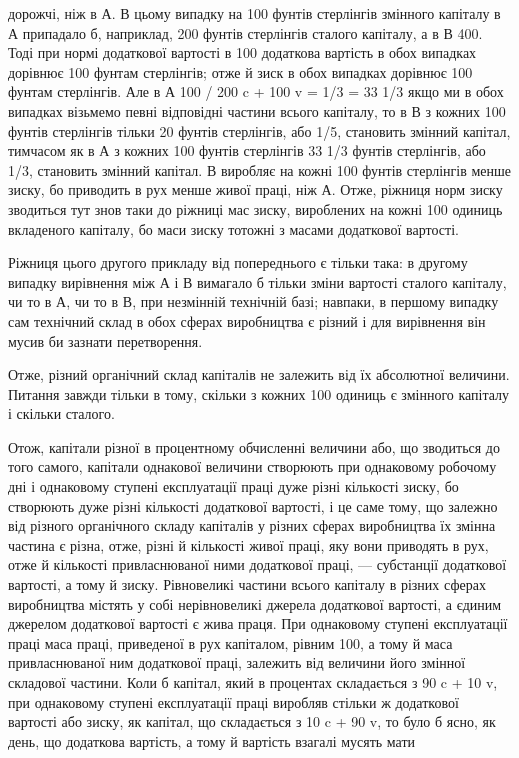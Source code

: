 дорожчі, ніж в А. В цьому випадку на 100 фунтів стерлінгів
змінного капіталу в А припадало б, наприклад, 200 фунтів
стерлінгів сталого капіталу, а в В 400. Тоді при нормі додаткової вартості в 100%
додаткова вартість в обох випадках дорівнює 100 фунтам стерлінгів; отже й зиск в обох випадках
дорівнює 100 фунтам стерлінгів. Але в А 100 / 200 c + 100 v =
1/3 = 33 1/3%
якщо ми в обох випадках візьмемо певні відповідні частини
всього капіталу, то в В з кожних 100 фунтів стерлінгів тільки
20 фунтів стерлінгів, або 1/5, становить змінний капітал, тимчасом як в А з кожних 100 фунтів
стерлінгів 33 1/3 фунтів стерлінгів, або 1/3, становить змінний капітал. В виробляє на кожні 100
фунтів стерлінгів менше зиску, бо приводить в рух менше
живої праці, ніж А. Отже, ріжниця норм зиску зводиться тут
знов таки до ріжниці мас зиску, вироблених на кожні 100 одиниць вкладеного капіталу, бо маси зиску
тотожні з масами додаткової вартості.

Ріжниця цього другого прикладу від попереднього є тільки
така: в другому випадку вирівнення між А і В вимагало б тільки
зміни вартості сталого капіталу, чи то в А, чи то в В, при незмінній технічній базі; навпаки, в
першому випадку сам технічний склад в обох сферах виробництва є різний і для вирівнення він мусив би
зазнати перетворення.

Отже, різний органічний склад капіталів не залежить від їх
абсолютної величини. Питання завжди тільки в тому, скільки
з кожних 100 одиниць є змінного капіталу і скільки сталого.

Отож, капітали різної в процентному обчисленні величини
або, що зводиться до того самого, капітали однакової величини
створюють при однаковому робочому дні і однаковому ступені
експлуатації праці дуже різні кількості зиску, бо створюють
дуже різні кількості додаткової вартості, і це саме тому, що
залежно від різного органічного складу капіталів у різних сферах виробництва їх змінна частина є
різна, отже, різні й кількості живої праці, яку вони приводять в рух, отже й кількості
привласнюваної ними додаткової праці, — субстанції додаткової
вартості, а тому й зиску. Рівновеликі частини всього капіталу
в різних сферах виробництва містять у собі нерівновеликі джерела додаткової вартості, а єдиним
джерелом додаткової вартості є жива праця. При однаковому ступені експлуатації праці маса праці,
приведеної в рух капіталом, рівним 100, а тому й
маса привласнюваної ним додаткової праці, залежить від величини
його змінної складової частини. Коли б капітал, який в процентах складається з 90 c + 10 v, при
однаковому ступені експлуатації праці виробляв стільки ж додаткової вартості або зиску, як капітал,
що складається з 10 c + 90 v, то було б ясно, як день,
що додаткова вартість, а тому й вартість взагалі мусять мати
